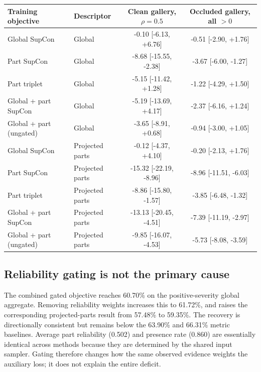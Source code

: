\documentclass[pdflatex,iicol,sn-apa]{sn-jnl}
\begin{document}
\begin{table}[t]
\begin{tabularx}{\textwidth}{@{}>{\raggedright\arraybackslash}Xlcc@{}}
\toprule
Training objective & Descriptor & \shortstack{Clean gallery,\\$\rho=0.5$} &
\shortstack{Occluded gallery,\\all $>0$} \\
\midrule
Global SupCon & Global & -0.10 [-6.13, +6.76] & -0.51 [-2.90, +1.76] \\
Part SupCon & Global & -8.68 [-15.55, -2.38] & -3.67 [-6.00, -1.27] \\
Part triplet & Global & -5.15 [-11.42, +1.28] & -1.22 [-4.29, +1.50] \\
Global + part SupCon & Global & -5.19 [-13.69, +4.17] & -2.37 [-6.16, +1.24] \\
Global + part (ungated) & Global & -3.65 [-8.91, +0.68] & -0.94 [-3.00, +1.05] \\
Global SupCon & Projected parts & -0.12 [-4.37, +4.10] & -0.20 [-2.13, +1.76] \\
Part SupCon & Projected parts & -15.32 [-22.19, -8.96] & -8.96 [-11.51, -6.03] \\
Part triplet & Projected parts & -8.86 [-15.80, -1.57] & -3.85 [-6.48, -1.32] \\
Global + part SupCon & Projected parts & -13.13 [-20.45, -4.51] & -7.39 [-11.19, -2.97] \\
Global + part (ungated) & Projected parts & -9.85 [-16.07, -4.53] & -5.73 [-8.08, -3.59] \\
\bottomrule
\end{tabularx}
\end{table}

\subsection{Reliability gating is not the primary cause}

The combined gated objective reaches 60.70\% on the positive-severity global
aggregate. Removing reliability weights increases this to 61.72\%, and raises
the corresponding projected-parts result from 57.48\% to 59.35\%. The recovery
is directionally consistent but remains below the 63.90\% and 66.31\% metric
baselines. Average part reliability (0.502) and presence rate (0.860) are
essentially identical across methods because they are determined by the shared
input sampler. Gating therefore changes how the same observed evidence weights
the auxiliary loss; it does not explain the entire deficit.
\end{document}
